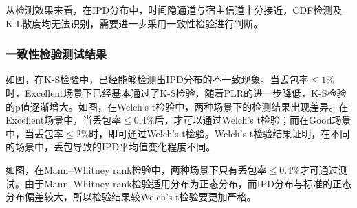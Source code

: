 从检测效果来看，在IPD分布中，时间隐通道与宿主信道十分接近，CDF检测及K-L散度均无法识别，需要进一步采用一致性检验进行判断。

\subsubsection{一致性检验测试结果}
\label{chap:analyze:result:ipd:statistical}

如图，在K-S检验中，已经能够检测出IPD分布的不一致现象。当丢包率$\le 1\%$时，Excellent场景下已经基本通过了K-S检验，随着PLR的进一步降低，K-S检验的p值逐渐增大。如图，在Welch's t检验中，两种场景下的检测结果出现差异。在Excellent场景中，当丢包率$\le 0.4\%$后，才可以通过Welch's t检验；而在Good场景中，当丢包率$\le 2\%$时，即可通过Welch's t检验。Welch's t检验结果证明，在不同的场景中，丢包导致的IPD平均值变化程度不同。

如图，在Mann–Whitney rank检验中，两种场景下只有丢包率$\le 0.4\%$才可通过测试。由于Mann–Whitney rank检验适用分布为正态分布，而IPD分布与标准的正态分布偏差较大，所以检验结果较Welch's t检验要更加严格。


